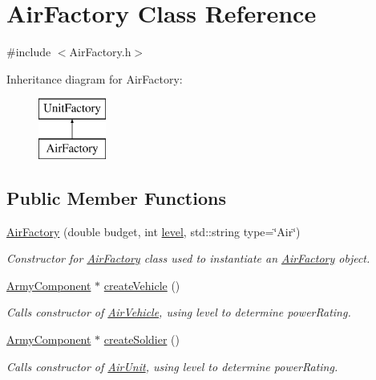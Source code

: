 \hypertarget{class_air_factory}{}\section{Air\+Factory Class Reference}
\label{class_air_factory}


{\ttfamily \#include $<$Air\+Factory.\+h$>$}

Inheritance diagram for Air\+Factory\+:\begin{figure}[H]
\begin{center}
\leavevmode
\includegraphics[height=2.000000cm]{class_air_factory}
\end{center}
\end{figure}
\subsection*{Public Member Functions}
\begin{DoxyCompactItemize}
\item 
\mbox{\hyperlink{class_air_factory_a732ac84bdb7a41c7118ac5e55a737165}{Air\+Factory}} (double budget, int \mbox{\hyperlink{class_unit_factory_ac8b73a1ed9adc43991450eb9aed0d40a}{level}}, std\+::string type=\char`\"{}Air\char`\"{})
\begin{DoxyCompactList}\small\item\em Constructor for \mbox{\hyperlink{class_air_factory}{Air\+Factory}} class used to instantiate an \mbox{\hyperlink{class_air_factory}{Air\+Factory}} object. \end{DoxyCompactList}\item 
\mbox{\hyperlink{class_army_component}{Army\+Component}} $\ast$ \mbox{\hyperlink{class_air_factory_aede47fe0f3be3714ccef1faed3354d00}{create\+Vehicle}} ()
\begin{DoxyCompactList}\small\item\em Calls constructor of \mbox{\hyperlink{class_air_vehicle}{Air\+Vehicle}}, using level to determine power\+Rating. \end{DoxyCompactList}\item 
\mbox{\hyperlink{class_army_component}{Army\+Component}} $\ast$ \mbox{\hyperlink{class_air_factory_a1a83eb38a4fd955b2f65064d508b9dda}{create\+Soldier}} ()
\begin{DoxyCompactList}\small\item\em Calls constructor of \mbox{\hyperlink{class_air_unit}{Air\+Unit}}, using level to determine power\+Rating. \end{DoxyCompactList}\end{DoxyCompactItemize}
